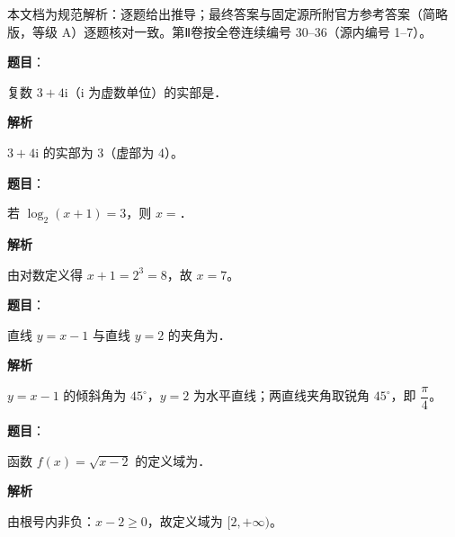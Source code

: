 
\begin{gktip}
本文档为规范解析：逐题给出推导；最终答案与固定源所附官方参考答案（简略版，等级 A）逐题核对一致。第Ⅱ卷按全卷连续编号 30–36（源内编号 1–7）。
\end{gktip}

\begin{answer}

\textbf{题目}：

复数 \(3+4\mathrm{i}\)（\(\mathrm{i}\) 为虚数单位）的实部是\gkblank{}．

\textbf{解析}

\(3+4\mathrm{i}\) 的实部为 \(3\)（虚部为 \(4\)）。


\end{answer}
\begin{answer}

\textbf{题目}：

若 \(\log_{2}(x+1)=3\)，则 \(x=\)\gkblank{}．

\textbf{解析}

由对数定义得 \(x+1=2^{3}=8\)，故 \(x=7\)。


\end{answer}
\begin{answer}

\textbf{题目}：

直线 \(y=x-1\) 与直线 \(y=2\) 的夹角为\gkblank{}．

\textbf{解析}

\(y=x-1\) 的倾斜角为 \(45^{\circ}\)，\(y=2\) 为水平直线；两直线夹角取锐角 \(45^{\circ}\)，即 \(\dfrac{\pi}{4}\)。


\end{answer}
\begin{answer}

\textbf{题目}：

函数 \(f(x)=\sqrt{x-2}\) 的定义域为\gkblank{}．

\textbf{解析}

由根号内非负：\(x-2\geqslant 0\)，故定义域为 \([2,+\infty)\)。

\gkanswer{答案：\([2,+\infty)\)}

\end{answer}
